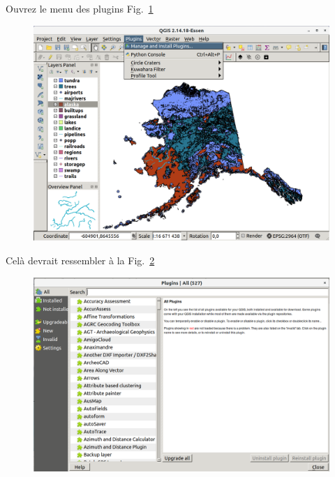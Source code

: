 Ouvrez le menu des plugins Fig.~\ref{fig:qgis008}

\begin{figure}[htbp]
   \centering
   \includegraphics[scale=0.19]{qgis008.png}
   \caption{}
   \label{fig:qgis008}
\end{figure}

Cel\`a devrait ressembler \`a la Fig.~\ref{fig:qgis009}

\begin{figure}[htbp]
   \centering
   \includegraphics[scale=0.19]{qgis009.png}
   \caption{}
   \label{fig:qgis009}
\end{figure}

